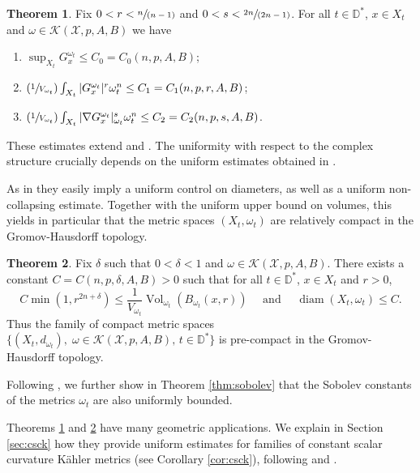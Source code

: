 \documentclass[11pt]{article}
\numberwithin{equation}{section}
\newcommand{\Psfrac}[2]{(\sfrac{#1}{#2})}
\newcommand{\spfrac}[2]{\sfrac{#1}{(#2)}}
\DeclareMathOperator{\diam}{diam}
\DeclareMathOperator{\Vol}{Vol}
\theoremstyle{definition}
\newtheorem{thmA}{Theorem}
\newcommand{\D}{\mathbb D}
\begin{document}
\begin{thmA}\label{thm_A}
Fix $0<r<\spfrac{n}{n-1}$ and $0<s< \spfrac{2n}{2n-1}$.
For all $t \in \D^*$, $x \in X_t$ and $\omega \in {\mathcal K}(\mathcal{X},p,A,B)$ we have
\begin{enumerate}
\item $\sup_{X_t} G_x^{\omega_t} \leq C_0=C_0(n,p,A,B)$;

\item $\Psfrac{1}{V_{\omega_t}} \int_{X_t} |G_x^{\omega_t}|^r \omega_t^n \leq C_1=C_1(n,p,r,A,B)$;

\item $\Psfrac{1}{V_{\omega_t}} \int_{X_t} |\nabla G_x^{\omega_t}|_{\omega_t}^s \omega_t^n \leq C_2=C_2(n,p,s,A,B)$.
\end{enumerate}
\end{thmA}

These estimates extend \cite[Th.\,1 \& Th.\,2]{GPS22} and \cite[Th.\,1.1]{GPSS22}.
The uniformity with respect to the complex structure crucially depends on the uniform estimates
obtained in \cite{DnGG23}.

As in \cite{GPSS22} they easily imply a uniform control on diameters, as well
as a uniform non-collapsing estimate. Together with the uniform upper bound on volumes, this yields
in particular that the metric spaces $(X_t,\omega_t)$ are relatively compact in the Gromov-Hausdorff topology.

\begin{thmA}\label{thm_B}
Fix $\delta$ such that $0<\delta<1$ and $\omega \in {\mathcal K}(\mathcal{X},p,A,B)$.
There exists a constant $C=C(n,p,\delta,A,B)>0$ such that for all $ t\in \D^*$, $x \in X_t$ and $r>0$,\vspace*{-3pt}
\[
C \min(1,r^{2n+\delta}) \leq \frac{1}{V_{\omega_t}} \Vol_{\omega_t}(B_{\omega_t}(x,r))
\quad \text{ and } \quad
\diam(X_t,\omega_t) \leq C.
\]
Thus the family of compact metric spaces
$\{ (X_t,d_{\omega_t}), \; \omega \in {\mathcal K}(\mathcal{X},p,A,B), \, t \in \D^* \}$
is pre-compact in the Gromov-Hausdorff topology.
\end{thmA}

Following \cite{GPSS23}, we further show in Theorem \ref{thm:sobolev}
that the Sobolev constants of the metrics $\omega_t$ are also uniformly bounded.

Theorems \ref{thm_A} and \ref{thm_B} have many geometric applications. We
explain in Section \ref{sec:csck} how they provide uniform estimates
for families of constant scalar curvature Kähler metrics (see Corollary \ref{cor:csck}), following
\cite{CC21} and \cite{PTT23}.
\end{document}
